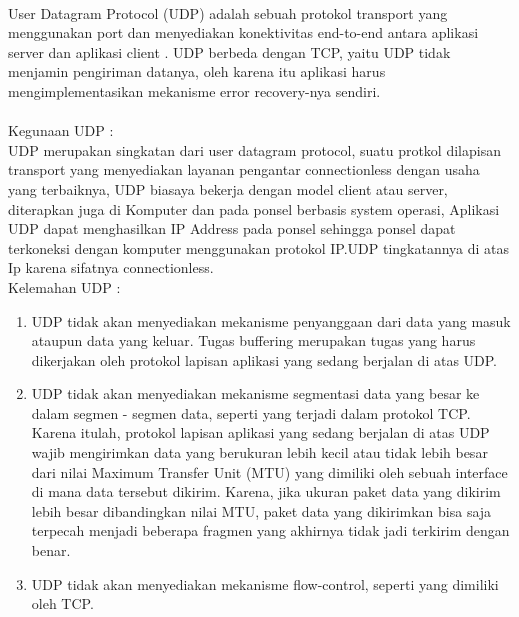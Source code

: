 \documentclass[12pt,a4paper]{article}
\begin{document}
\paragraph{}
\hspace{1cm}
User Datagram Protocol (UDP) adalah sebuah protokol transport yang menggunakan port dan menyediakan konektivitas end-to-end antara aplikasi server dan aplikasi client . UDP berbeda dengan TCP, yaitu UDP tidak menjamin pengiriman datanya, oleh karena itu aplikasi harus mengimplementasikan mekanisme error recovery-nya sendiri.\\
\paragraph{}
\hspace{1cm}
Kegunaan UDP : \\
UDP merupakan singkatan dari user datagram protocol, suatu protkol dilapisan transport yang menyediakan  layanan pengantar connectionless dengan usaha yang terbaiknya, UDP biasaya bekerja dengan model client atau server, diterapkan juga di Komputer dan pada ponsel berbasis system operasi, Aplikasi UDP dapat menghasilkan IP Address pada ponsel sehingga ponsel dapat terkoneksi dengan komputer menggunakan protokol IP.UDP tingkatannya di atas Ip karena sifatnya connectionless.\\

Kelemahan UDP :
\begin{enumerate}
\item UDP tidak akan menyediakan mekanisme penyanggaan dari data yang masuk ataupun data yang keluar. Tugas buffering merupakan tugas yang harus dikerjakan oleh protokol lapisan aplikasi yang sedang berjalan di atas UDP.
\item UDP tidak akan menyediakan mekanisme segmentasi data yang besar ke dalam segmen - segmen data, seperti yang terjadi dalam protokol TCP. Karena itulah, protokol lapisan aplikasi yang sedang berjalan di atas UDP wajib mengirimkan data yang berukuran lebih kecil atau tidak lebih besar dari nilai Maximum Transfer Unit (MTU) yang dimiliki oleh sebuah interface di mana data tersebut dikirim. Karena, jika ukuran paket data yang dikirim lebih besar dibandingkan nilai MTU, paket data yang dikirimkan bisa saja terpecah menjadi beberapa fragmen yang akhirnya tidak jadi terkirim dengan benar.
\item UDP tidak akan menyediakan mekanisme flow-control, seperti yang dimiliki oleh TCP.
\end{enumerate}
\end{document}

